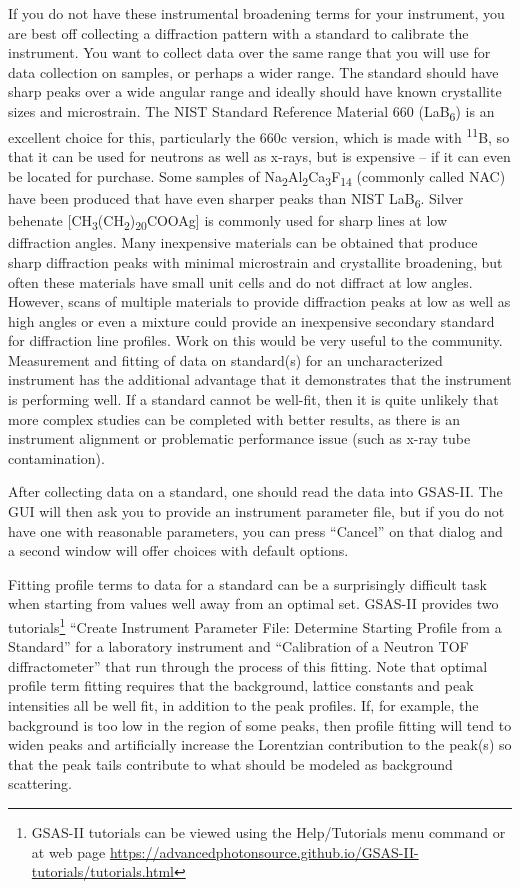  If you do not have these instrumental broadening terms for your instrument, you are best off collecting a diffraction pattern with a standard to calibrate the instrument. You want to collect data over the same range that you will use for data collection on samples, or perhaps a wider range. The standard should have sharp peaks over a wide angular range and ideally should have known crystallite sizes and microstrain. The NIST Standard Reference Material 660 (LaB\textsubscript{6}) is an excellent choice for this, particularly the 660c version, which is made with \textsuperscript{11}B, so that it can be used for neutrons as well as x-rays, but is expensive -- if it can even be located for purchase. Some samples of Na\textsubscript{2}Al\textsubscript{2}Ca\textsubscript{3}F\textsubscript{14} (commonly called NAC) have been produced that have even sharper peaks than NIST LaB\textsubscript{6}. Silver behenate [CH\textsubscript{3}(CH\textsubscript{2})\textsubscript{20}COOAg] is commonly used for sharp lines at low diffraction angles. Many inexpensive materials can be obtained that produce sharp diffraction peaks with minimal microstrain and crystallite broadening, but often these materials have small unit cells and do not diffract at low angles. However, scans of multiple materials to provide diffraction peaks at low as well as high angles or even a mixture could provide an inexpensive secondary standard for diffraction line profiles. Work on this would be very useful to the community. Measurement and fitting of data on standard(s) for an uncharacterized instrument has the additional advantage that it demonstrates that the instrument is performing well. If a standard cannot be well-fit, then it is quite unlikely that more complex studies can be completed with better results, as there is an instrument alignment or problematic performance issue (such as x-ray tube contamination). 

 After collecting data on a standard, one should read the data into GSAS-II. The GUI will then ask you to provide an instrument parameter file, but if you do not have one with reasonable parameters, you can press “Cancel” on that dialog and a second window will offer choices with default options. 

 Fitting profile terms to data for a standard can be a surprisingly difficult task when starting from values well away from an optimal set. GSAS-II provides two tutorials\footnote{GSAS-II tutorials can be viewed using the Help/Tutorials menu command or at web page \url{https://advancedphotonsource.github.io/GSAS-II-tutorials/tutorials.html}}  
 ``Create Instrument Parameter File: Determine Starting Profile from a Standard”
 for a laboratory instrument and 
 ``Calibration of a Neutron TOF diffractometer” that run through the process of this fitting. Note that optimal profile term fitting requires that the background, lattice constants and peak intensities all be well fit, in addition to the peak profiles. If, for example, the background is too low in the region of some peaks, then profile fitting will tend to widen peaks and artificially increase the Lorentzian contribution to the peak(s) so that the peak tails contribute to what should be modeled as background scattering. 

